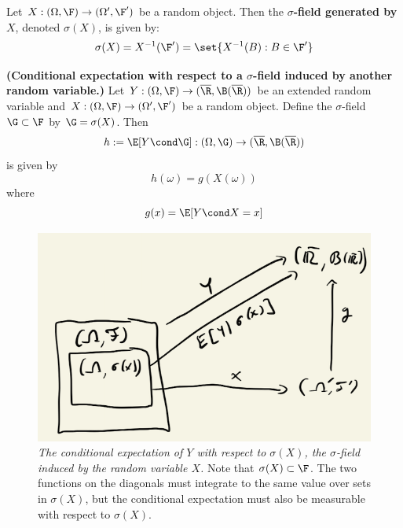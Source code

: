 \documentclass{article} %
\begin{document}
\begin{definition}
Let $X: (\Omega, \F) \to (\Omega', \F')$ be a random object.  Then the \textbf{$\sigma$-field generated by $X$}, denoted $\sigma(X)$, is given by:
\[ \sigma(X) = X^{-1}(\F') = \set{X^{-1}(B) : B \in \F'} \]
\label{def:sigma_field_generated_by_a_random_object}
\end{definition}

\begin{proposition}\textbf{(Conditional expectation with respect to a $\sigma$-field induced by another random variable.)}
Let $Y: (\Omega, \F) \to (\overline{\R}, \B(\overline{\R}))$ be an extended random variable and  $X: (\Omega, \F) \to (\Omega', \F')$ be a random object.  Define the $\sigma$-field $\G \subset \F$ by $\G =\sigma(X)$.  
Then 
\[ h:= \E[Y \cond \G] : (\Omega, \G) \to (\overline{\R}, \B(\overline{\R}))\]
is given by 
\[ h(\omega) = g(X(\omega))\]
where 
\[g(x) = \E[Y \cond X=x]\]
\label{prop:conditional_expectation_wrt_sigma_field_induced_by_another_random_variable}
\end{proposition}

\begin{figure}[H]
\centering
\includegraphics[width=.6\linewidth]{images/conditional_expectation_wrt_sigma_field_induced_by_RV}
\caption{\textit{The conditional expectation of $Y$ with respect to $\sigma(X)$, the $\sigma$-field induced by the random variable $X$.} Note that $\sigma(X) \subset \F$. The two functions on the diagonals must integrate to the same value over sets in $\sigma(X)$, but the conditional expectation must also be measurable with respect to $\sigma(X)$.}
\label{fig:conditional_expectation_with_respect_to_a_sigma_field_induced_by_another_random_variable}	
\end{figure}
\end{document}
